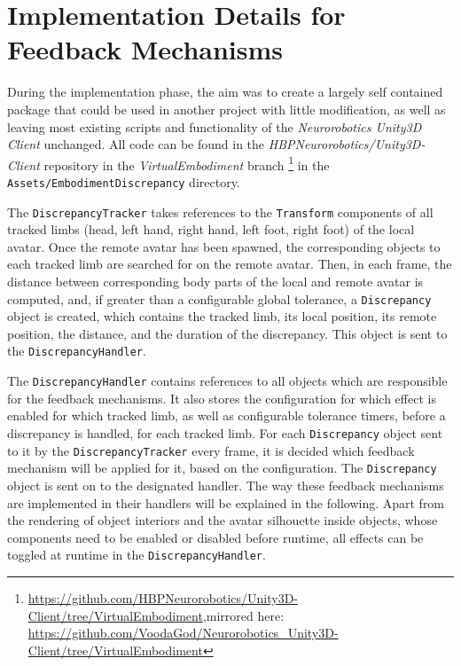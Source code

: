 \section{Implementation Details for Feedback Mechanisms}

During the implementation phase, the aim was to create a largely self contained package that could be used in another project with little modification, as well as leaving most existing scripts and functionality of the \textit{Neurorobotics Unity3D Client} unchanged.
All code can be found in the \textit{HBPNeurorobotics/Unity3D-Client} repository in the \textit{VirtualEmbodiment} branch \footnote{\url{https://github.com/HBPNeurorobotics/Unity3D-Client/tree/VirtualEmbodiment},{\newline}mirrored here: \url{https://github.com/VoodaGod/Neurorobotics_Unity3D-Client/tree/VirtualEmbodiment}} in the \texttt{Assets/EmbodimentDiscrepancy} directory.
\newline

The \texttt{DiscrepancyTracker} takes references to the \texttt{Transform} components of all tracked limbs (head, left hand, right hand, left foot, right foot) of the local avatar. Once the remote avatar has been spawned, the corresponding objects to each tracked limb are searched for on the remote avatar. 
\newline
Then, in each frame, the distance between corresponding body parts of the local and remote avatar is computed, and, if greater than a configurable global tolerance, a \texttt{Discrepancy} object is created, which contains the tracked limb, its local position, its remote position, the distance, and the duration of the discrepancy. This object is sent to the \texttt{DiscrepancyHandler}.
\newline

The \texttt{DiscrepancyHandler} contains references to all objects which are responsible for the feedback mechanisms. It also stores the configuration for which effect is enabled for which tracked limb, as well as configurable tolerance timers, before a discrepancy is handled, for each tracked limb.
\newline
For each \texttt{Discrepancy} object sent to it by the \texttt{DiscrepancyTracker} every frame, it is decided which feedback mechanism will be applied for it, based on the configuration. The \texttt{Discrepancy} object is sent on to the designated handler.
\newline
The way these feedback mechanisms are implemented in their handlers will be explained in the following. Apart from the rendering of object interiors and the avatar silhouette inside objects, whose components need to be enabled or disabled before runtime, all effects can be toggled at runtime in the \texttt{DiscrepancyHandler}.


